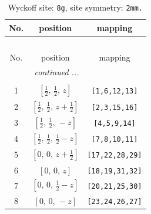 \documentclass[fleqn,8pt]{jsarticle}
\begin{document}
\begin{longtable}{ccc}
\caption{Wyckoff site: {\tt 8g}, site symmetry: {\tt 2mm.}}
 \\
 \hline \hline
No. & position & mapping \\ \hline \endfirsthead

\multicolumn{2}{l}{\tablename\ \thetable{}} \\
 \hline \hline
No. & position & mapping \\ \hline \endhead

 \hline \hline
\multicolumn{2}{r}{\footnotesize\it continued ...} \\ \endfoot

 \hline \hline
\multicolumn{2}{r}{} \\ \endlastfoot

1 & $\left[ \frac{1}{2},\, \frac{1}{2},\, z \right]$ & {\tt [1,6,12,13]} \\ \hline
2 & $\left[ \frac{1}{2},\, \frac{1}{2},\, z + \frac{1}{2} \right]$ & {\tt [2,3,15,16]} \\ \hline
3 & $\left[ \frac{1}{2},\, \frac{1}{2},\, - z \right]$ & {\tt [4,5,9,14]} \\ \hline
4 & $\left[ \frac{1}{2},\, \frac{1}{2},\, \frac{1}{2} - z \right]$ & {\tt [7,8,10,11]} \\ \hline
5 & $\left[ 0,\, 0,\, z + \frac{1}{2} \right]$ & {\tt [17,22,28,29]} \\ \hline
6 & $\left[ 0,\, 0,\, z \right]$ & {\tt [18,19,31,32]} \\ \hline
7 & $\left[ 0,\, 0,\, \frac{1}{2} - z \right]$ & {\tt [20,21,25,30]} \\ \hline
8 & $\left[ 0,\, 0,\, - z \right]$ & {\tt [23,24,26,27]} \\
\end{longtable}
\renewcommand{\arraystretch}{1.2}
\end{document}
